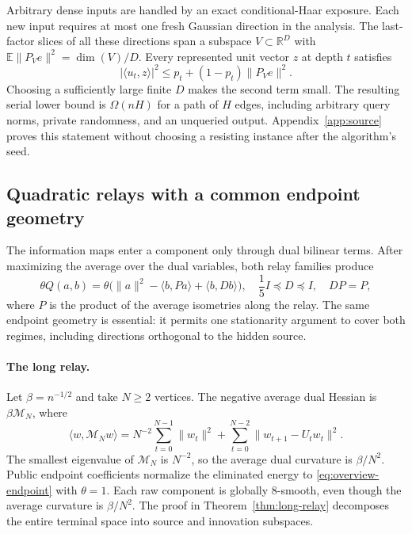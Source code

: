 \documentclass[11pt,letterpaper]{article}
\theoremstyle{definition}
\theoremstyle{remark}
\newcommand{\R}{\mathbb R}
\newcommand{\E}{\mathbb E}
\begin{document}
Arbitrary dense inputs are handled by an exact conditional-Haar exposure.
Each new input requires at most one fresh Gaussian direction in the analysis. The last-factor
slices of all these directions span a subspace $V\subset\R^D$ with
$\E\|P_Ve\|^2=\dim(V)/D$. Every represented unit vector $z$ at depth $t$
satisfies
\begin{equation}
 |\langle u_t,z\rangle|^2
 \le p_t+(1-p_t)\|P_Ve\|^2.
 \label{eq:overview-correlation}
\end{equation}
Choosing a sufficiently large finite $D$ makes the second term small.
The resulting serial lower bound is $\Omega(nH)$ for a path of $H$ edges,
including arbitrary query norms, private randomness, and an unqueried
output. Appendix~\ref{app:source} proves this statement without choosing a
resisting instance after the algorithm's seed.

\subsection{Quadratic relays with a common endpoint geometry}

The information maps enter a component only through dual bilinear terms.
After maximizing the average over the dual variables, both relay families
produce
\begin{equation}
 \theta Q(a,b)
 =\theta\bigl(\|a\|^2-\langle b,Pa\rangle+\langle b,Db\rangle\bigr),
 \quad \frac15I\preceq D\preceq I,\quad DP=P,
 \label{eq:overview-endpoint}
\end{equation}
where $P$ is the product of the average isometries along the relay.
The same endpoint geometry is essential: it permits one stationarity
argument to cover both regimes, including directions orthogonal to the
hidden source.

\paragraph{The long relay.}
Let $\beta=n^{-1/2}$ and take $N\ge2$ vertices. The negative average dual
Hessian is $\beta\mathcal M_N$, where
\[
 \langle w,\mathcal M_Nw\rangle
 =N^{-2}\sum_{t=0}^{N-1}\|w_t\|^2
   +\sum_{t=0}^{N-2}\|w_{t+1}-U_tw_t\|^2.
\]
The smallest eigenvalue of $\mathcal M_N$ is $N^{-2}$, so the average dual
curvature is $\beta/N^2$. Public endpoint coefficients normalize
the eliminated energy to \eqref{eq:overview-endpoint} with $\theta=1$.
Each raw component is globally $8$-smooth, even though the average
curvature is $\beta/N^2$. The proof in
Theorem~\ref{thm:long-relay} decomposes the entire terminal space into
source and innovation subspaces.
\end{document}
